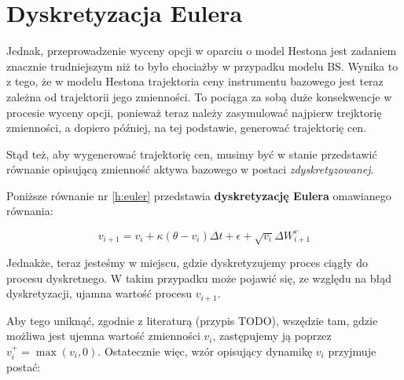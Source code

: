 \documentclass{pracamgr}
\begin{document}







\section{Dyskretyzacja Eulera}

Jednak, przeprowadzenie wyceny opcji w oparciu o model Hestona jest zadaniem znacznie trudniejszym
niż to było chociażby w przypadku modelu BS. Wynika to z tego, że w modelu Hestona trajektoria 
ceny instrumentu bazowego jest teraz zależna od trajektorii jego zmienności. To pociąga za sobą 
duże konsekwencje w procesie wyceny opcji, ponieważ teraz należy zasymulować najpierw trejktorię
zmienności, a dopiero później, na tej podstawie, generować trajektorię cen. 

Stąd też, aby wygenerować trajektorię cen, musimy być w stanie przedstawić równanie opisującą
zmienność aktywa bazowego w postaci \textit{zdyskretyzowanej}.

Poniższe równanie nr \ref{h:euler} przedstawia \textbf{dyskretyzację Eulera} omawianego równania:
 
\begin{equation}\label{h:euler}
v_{i+1}  = v_i + \kappa (\theta - v_i) \Delta t + \epsilon +  \sqrt{v_i} \Delta W^{v}_{i+1}
\end{equation}

Jednakże, teraz jesteśmy w miejscu, gdzie dyskretyzujemy proces ciągły do procesu dyskretnego. 
W takim przypadku może pojawić się, ze względu na błąd dyskretyzacji, ujamna wartość procesu $v_{i+1}$.

Aby tego uniknąć, zgodnie z literaturą (przypis TODO), wszędzie tam, gdzie możliwa jest ujemna 
wartość zmienności $v_i$, zastępujemy ją poprzez $v_i^+ = \max(v_i, 0)$. Ostatecznie więc, wzór
opisujący dynamikę $v_i$ przyjmuje postać:
\end{document}
